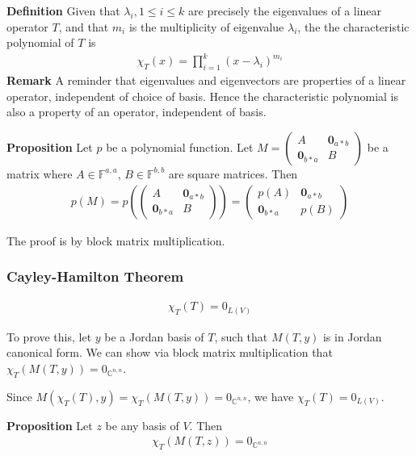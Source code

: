 \documentclass{article}
\begin{document}
\textbf{Definition} Given that $\lambda_i, 1\leq i\leq k$ are precisely the eigenvalues of a linear operator $T$, and that $m_i$ is the multiplicity of eigenvalue $\lambda_i$, the the characteristic polynomial of $T$ is 
\begin{align*}
	\chi_T(x)=\prod_{i=1}^k (x-\lambda_i)^{m_i}
\end{align*}
\textbf{Remark} A reminder that eigenvalues and eigenvectors are properties of a linear operator, independent of choice of basis. Hence the characteristic polynomial is also a property of an operator, independent of basis.


\textbf{Proposition} Let $p$ be a polynomial function. Let $M=\begin{pmatrix}
A & \mathbf{0}_{a*b}\\
\mathbf{0}_{b*a} & B
\end{pmatrix}$ be a matrix where $A\in \mathbb{F}^{a,a}$, $B\in \mathbb{F}^{b,b}$ are square matrices. Then 
\begin{align*}
	p(M) = p\left(\begin{pmatrix}
A & \mathbf{0}_{a*b}\\
\mathbf{0}_{b*a} & B
\end{pmatrix}\right) = \begin{pmatrix}
p(A) & \mathbf{0}_{a*b}\\
\mathbf{0}_{b*a} & p(B)
\end{pmatrix}
\end{align*}

The proof is by block matrix multiplication.


\subsubsection{Cayley-Hamilton Theorem}
\begin{align*}
	\chi_T(T)=0_{L(V)}
\end{align*}

To prove this, let $y$ be a Jordan basis of $T$, such that $M(T, y)$ is in Jordan canonical form. We can show via block matrix multiplication that $\chi_T(M(T,y))=0_{\mathbb{C}^{n,n}}$.

Since $M(\chi_T(T), y) = \chi_T(M(T, y)) = 0_{\mathbb{C}^{n,n}}$, we have $\chi_T(T)=0_{L(V)}$.

\textbf{Proposition} Let $z$ be any basis of $V$. Then 
\begin{align*}
	\chi_T(M(T,z))=0_{\mathbb{C}^{n,n}}
\end{align*}
\end{document}
